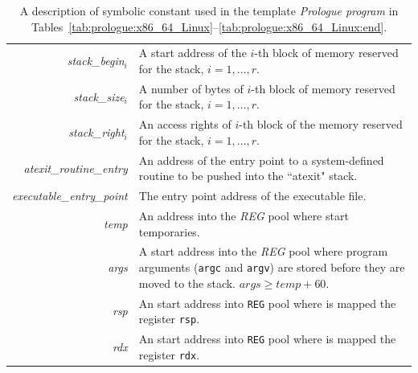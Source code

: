 \documentclass[10pt,twocolumn]{article}
\begin{document}
\begin{table}[!h]
\begin{center}
\begin{tabular}{rp{10cm}}
\textit{stack\_begin}$ _i $ %
& A start address of the $ i $-th block of memory reserved for the stack, $ i =
1,\ldots,r $. %
\\

\textit{stack\_size}$ _i $ %
& A number of bytes of $ i $-th block of memory reserved for the stack, $ i =
1,\ldots,r $. %
\\

\textit{stack\_right}$ _i $ %
& An access rights of $ i $-th block of the memory reserved for the stack, $ i =
1,\ldots,r $. %
\\

\textit{atexit\_routine\_entry} %
& An address of the entry point to a system-defined routine to be pushed into
the ``atexit" stack. %
\\

\textit{executable\_entry\_point} %
& The entry point address of the executable file. %
\\

\textit{temp} %
& An address into the \textit{REG} pool where start temporaries.
%
\\

\textit{args} %
& A start address into the \textit{REG} pool where program arguments (\texttt{argc} and \texttt{argv}) are stored before they are moved to the stack. $ \mathit{args} \geq
\mathit{temp} + 60 $. %
\\

\textit{rsp} %
& An start address into \texttt{REG} pool where is mapped the register \texttt{rsp}.
%
\\

\textit{rdx} %
& An start address into \texttt{REG} pool where is mapped the register \texttt{rdx}.
%
\\

\end{tabular}
\end{center}
\caption{A description of symbolic constant used in the template \emph{Prologue
program} in
Tables~\ref{tab:prologue:x86_64_Linux}--\ref{tab:prologue:x86_64_Linux:end}.} %
\label{tab:prologue:x86_64_Linux:constants}
\end{table}

\clearpage

\end{document}
